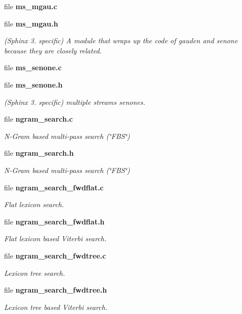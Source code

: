 \begin{DoxyCompactItemize}
file {\bfseries ms\+\_\+mgau.\+c}
\item 
file {\bf ms\+\_\+mgau.\+h}
\begin{DoxyCompactList}\small\item\em (Sphinx 3. specific) A module that wraps up the code of gauden and senone because they are closely related. \end{DoxyCompactList}\item 
file {\bfseries ms\+\_\+senone.\+c}
\item 
file {\bf ms\+\_\+senone.\+h}
\begin{DoxyCompactList}\small\item\em (Sphinx 3. specific) multiple streams senones. \end{DoxyCompactList}\item 
file {\bf ngram\+\_\+search.\+c}
\begin{DoxyCompactList}\small\item\em N-\/\+Gram based multi-\/pass search (\char`\"{}\+F\+B\+S\char`\"{}) \end{DoxyCompactList}\item 
file {\bf ngram\+\_\+search.\+h}
\begin{DoxyCompactList}\small\item\em N-\/\+Gram based multi-\/pass search (\char`\"{}\+F\+B\+S\char`\"{}) \end{DoxyCompactList}\item 
file {\bf ngram\+\_\+search\+\_\+fwdflat.\+c}
\begin{DoxyCompactList}\small\item\em Flat lexicon search. \end{DoxyCompactList}\item 
file {\bf ngram\+\_\+search\+\_\+fwdflat.\+h}
\begin{DoxyCompactList}\small\item\em Flat lexicon based Viterbi search. \end{DoxyCompactList}\item 
file {\bf ngram\+\_\+search\+\_\+fwdtree.\+c}
\begin{DoxyCompactList}\small\item\em Lexicon tree search. \end{DoxyCompactList}\item 
file {\bf ngram\+\_\+search\+\_\+fwdtree.\+h}
\begin{DoxyCompactList}\small\item\em Lexicon tree based Viterbi search. \end{DoxyCompactList}\item 

\end{DoxyCompactItemize}

